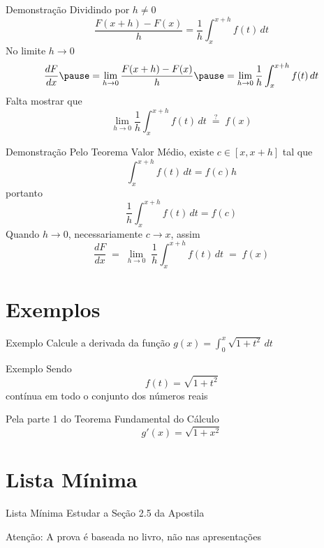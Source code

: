 \begin{frame}{Demonstração}
  Dividindo por $h\neq 0$
  \[
    \frac{F(x+h) - F(x)}{h} = \frac{1}{h} \int_x^{x+h} f(t)\,dt
  \]
  \pause
  No limite $h\to 0$
  \[
    \frac{dF}{dx}
    \pause
    = \lim_{h\to0} \frac{F(x+h) - F(x)}{h}
    \pause
    = \lim_{h\to0} \frac{1}{h} \int_x^{x+h} f(t)\,dt
  \]
  \pause
  Falta mostrar que
  \[
    \lim_{h\to 0} \frac{1}{h} \int_x^{x+h} f(t)\,dt \;\stackrel{?}{=}\; f(x)
  \]
\end{frame}

\begin{frame}{Demonstração}
  Pelo Teorema Valor Médio,
  \pause
  existe \(c\in[x, x+h]\) tal que
  \[
    \int_x^{x+h} f(t)\,dt = f(c)h
  \]
  \pause
  portanto
  \[
    \frac{1}{h} \int_x^{x+h} f(t)\,dt = f(c)
  \]
  \pause
  Quando $h\to0$,
  \pause
  necessariamente $c\to x$,
  \pause
  assim
  \[
    \frac{dF}{dx}
    \;=\; \lim_{h\to 0}\; \frac{1}{h} \int_x^{x+h} f(t)\,dt
    \;=\; f(x)
  \]
\end{frame}

\section{Exemplos}

\addtocounter{exemplo}{1}
\begin{frame}{Exemplo \theexemplo}
  Calcule a derivada da função \(g(x)=\int_0^x \sqrt{1+t^2} \,dt\)
\end{frame}

\begin{frame}{Exemplo \theexemplo}
  Sendo
  \[
    f(t)= \sqrt{1+t^2}
  \]
  contínua em todo o conjunto dos números reais

  \pause
  Pela parte 1 do Teorema Fundamental do Cálculo
  \[
    g'(x)=\sqrt{1+x^2}
  \]
\end{frame}

\section{Lista Mínima}

\begin{frame}{Lista Mínima}
  Estudar a Seção 2.5 da Apostila

  \vfill
  Atenção: A prova é baseada no livro, não nas apresentações
\end{frame}


